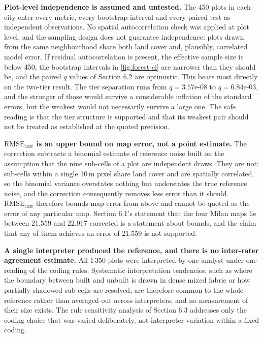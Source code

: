 \documentclass[11pt,a4paper]{article}
\begin{document}
\textbf{Plot-level independence is assumed and untested.} The 450 plots in each city
enter every metric, every bootstrap interval and every paired test as
independent observations. No spatial autocorrelation check was applied at plot
level, and the sampling design does not guarantee independence: plots drawn from
the same neighbourhood share both land cover and, plausibly, correlated model
error. If residual autocorrelation is present, the effective sample size is
below 450, the bootstrap intervals in \cref{fig:forest-ci} are narrower than they
should be, and the paired $q$ values of Section 6.2 are optimistic. This bears
most directly on the two-tier result. The tier separation runs from
$q = 3.57$e-08 to $q = 6.84$e-03, and the stronger of those would survive a
considerable inflation of the standard errors, but the weakest would not
necessarily survive a large one. The safe reading is that the tier structure is
supported and that its weakest pair should not be treated as established at the
quoted precision.

\textbf{$\mathrm{RMSE}_{\mathrm{corr}}$ is an upper bound on map error, not a point
estimate.} The correction subtracts a binomial estimate of reference noise built
on the assumption that the nine sub-cells of a plot are independent draws. They
are not: sub-cells within a single 10\,m pixel share land cover and are spatially
correlated, so the binomial variance overstates nothing but understates the true
reference noise, and the correction consequently removes less error than it
should. $\mathrm{RMSE}_{\mathrm{corr}}$ therefore bounds map error from above and
cannot be quoted as the error of any particular map. Section 6.1's statement that
the four Milan maps lie between 21.559 and 22.917 corrected is a statement about
bounds, and the claim that any of them achieves an error of 21.559 is not
supported.

\textbf{A single interpreter produced the reference, and there is no inter-rater
agreement estimate.} All 1\,350 plots were interpreted by one analyst under one
reading of the coding rules. Systematic interpretation tendencies, such as where
the boundary between built and unbuilt is drawn in dense mixed fabric or how
partially shadowed sub-cells are resolved, are therefore common to the whole
reference rather than averaged out across interpreters, and no measurement of
their size exists. The rule sensitivity analysis of Section 6.3 addresses only
the coding choice that was varied deliberately, not interpreter variation within
a fixed coding.
\end{document}
